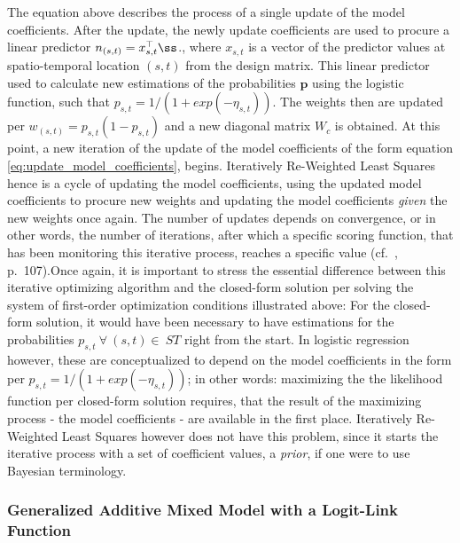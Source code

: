 \documentclass[
  12pt,
]{article}
\begin{document}
The equation above describes the process of a single update of the model
coefficients. After the update, the newly update coefficients are used
to procure a linear predictor \(n_{(s,t)}=x_{s,t}^\topß\)., where
\(x_{s,t}\) is a vector of the predictor values at spatio-temporal
location \((s,t)\) from the design matrix. This linear predictor used to
calculate new estimations of the probabilities \(\boldsymbol{p}\) using
the logistic function, such that
\(p_{s,t} = 1 / (1 + exp(-\eta_{s,t}))\). The weights then are updated
per \(w_{(s,t)} = p_{s,t}(1 - p_{s,t})\) and a new diagonal matrix
\(W_{c}\) is obtained. At this point, a new iteration of the update of
the model coefficients of the form equation
\ref{eq:update_model_coefficients}, begins. Iteratively Re-Weighted
Least Squares hence is a cycle of updating the model coefficients, using
the updated model coefficients to procure new weights and updating the
model coefficients \textit{given} the new weights once again. The number
of updates depends on convergence, or in other words, the number of
iterations, after which a specific scoring function, that has been
monitoring this iterative process, reaches a specific value
(cf.~\cite{Wood.2017}, p.~107).\newline Once again, it is important to
stress the essential difference between this iterative optimizing
algorithm and the closed-form solution per solving the system of
first-order optimization conditions illustrated above: For the
closed-form solution, it would have been necessary to have estimations
for the probabilities \(p_{s,t}\:\forall\:(s,t)\in\:ST\) right from the
start. In logistic regression however, these are conceptualized to
depend on the model coefficients in the form per
\(p_{s,t} = 1 / (1 + exp(-\eta_{s,t}))\); in other words: maximizing the
the likelihood function per closed-form solution requires, that the
result of the maximizing process - the model coefficients - are
available in the first place. Iteratively Re-Weighted Least Squares
however does not have this problem, since it starts the iterative
process with a set of coefficient values, a \textit{prior}, if one were
to use Bayesian terminology.

\hypertarget{generalized-additive-mixed-model-with-a-logit-link-function}{%
\subsubsection{Generalized Additive Mixed Model with a Logit-Link
Function}\label{generalized-additive-mixed-model-with-a-logit-link-function}}
\end{document}

